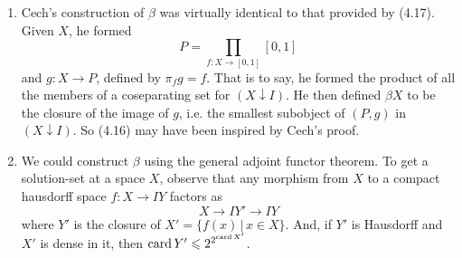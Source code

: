 \documentclass{article}
\begin{document}
\begin{remarks} \hspace{0.1cm}
    \begin{enumerate}
        \item[(a)] Cech's construction of $\beta$ was virtually identical to that provided by (4.17). Given $X$, he formed \[ P = \prod_{f:X \to [0,1]} [0,1]\] and $g: X \to P$, defined by $\pi_{f}g=f$. That is to say, he formed the product of all the members of a coseparating set for $(X \downarrow I)$. He then defined $\beta X$ to be the closure of the image of $g$, i.e. the smallest subobject of $(P,g)$ in $(X \downarrow I)$. So (4.16) may have been inspired by Cech's proof.
        \item[(b)] We could construct $\beta$ using the general adjoint functor theorem. To get a solution-set at a space $X$, observe that any morphism from $X$ to a compact hausdorff space $f: X \to IY$ factors as \[ X \to IY' \to IY\] where $Y'$ is the closure of $X' = \{f(x) \, | \, x \in X \}$. And, if $Y'$ is Hausdorff and $X'$ is dense in it, then $\operatorname{card} Y' \leqslant 2^{2^{\operatorname{card} X'}}$.
    \end{enumerate}
\end{remarks}
\end{document}
